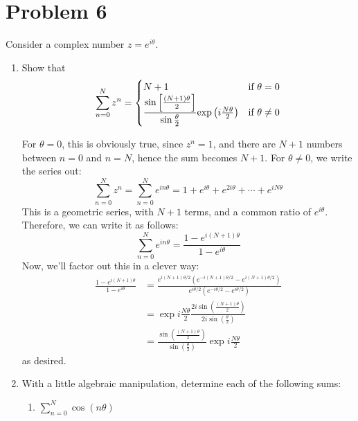 \documentclass[10pt]{article}
\begin{document}
	\section*{Problem 6}
	Consider a complex number \( z = e^{i\theta} \).
	\begin{enumerate}[label=\alph*)]
		\item Show that 
			\[
				\sum_{n = 0}^{N}z^{n} = \begin{cases}
					N + 1 & \text{if \( \theta = 0 \)}\\
					\dfrac{\sin \left[ \frac{(N + 1) \theta}{2} \right] }{\sin \frac{\theta}{2}} \exp{ i 
				\frac{N \theta}{2}}& \text{if \( \theta \neq 0 \)}
				\end{cases}
			\] 
			\begin{solution}
				For \( \theta = 0 \), this is obviously true, since \( z^n = 1 \), and there are \( N+1 \) numbers
				between \( n = 0 \) and \( n = N \), hence the sum becomes \( N + 1 \). For \( \theta \neq 0 \), we 
				write the series out:
				\[
				\sum_{n = 0}^{N}z^{n} = \sum_{n = 0}^{N}e^{i n \theta} = 1 + e^{i \theta} + e^{2 i \theta} + \cdots 
				+ e^{i N \theta}
				\] 
				This is a geometric series, with \( N + 1 \) terms, and a common ratio of \( e^{ i \theta} \). 
				Therefore, we can write it as follows:
				\[
				\sum_{n = 0}^{N} e^{ i n \theta} = \frac{1 - e^{i (N + 1) \theta}}{1 - e^{i \theta}}
				\] 
				Now, we'll factor out this in a clever way:
				\begin{align*}
					\frac{1 - e^{i (N + 1)\theta}}{1 - e^{i \theta}} &= \frac{e^{i (N + 1) \theta / 2}
					\left( e^{-i(N + 1)\theta / 2} - e^{i (N + 1) \theta/2} \right) }
					{e^{i \theta / 2} \left( e^{- i \theta / 2} - e^{i \theta / 2} \right) } \\
					&= \exp{i \frac{N \theta}{2}} \frac{2i \sin\left( \frac{(N + 1) \theta}{2} \right) }
					{2i \sin\left(\frac{\theta}{2}\right)}\\
					&= \frac{\sin\left( \frac{(N + 1) \theta}{2} \right) }
					{\sin\left( \frac{\theta}{2} \right) } \exp{i \frac{N \theta}{2}}
				\end{align*}
				as desired. 
			\end{solution}
		\item With a little algebraic manipulation, determine each of the following sums:
			\begin{enumerate}[label=\roman*)]
				\item \( \sum_{n = 0}^{N} \cos(n \theta) \) 


\end{enumerate}
\end{enumerate}
\end{document}
